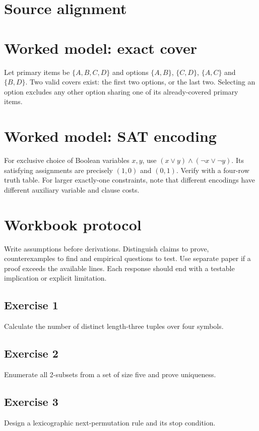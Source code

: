 \documentclass[11pt,letterpaper]{article}
\begin{document}
\tableofcontents
\clearpage
{}
\section{Source alignment}

\section{Worked model: exact cover}
Let primary items be $\{A,B,C,D\}$ and options $\{A,B\}$, $\{C,D\}$, $\{A,C\}$ and $\{B,D\}$. Two valid covers exist: the first two options, or the last two. Selecting an option excludes any other option sharing one of its already-covered primary items.
\section{Worked model: SAT encoding}
For exclusive choice of Boolean variables $x,y$, use $(x\lor y)\land(\neg x\lor\neg y)$. Its satisfying assignments are precisely $(1,0)$ and $(0,1)$. Verify with a four-row truth table. For larger exactly-one constraints, note that different encodings have different auxiliary variable and clause costs.

\section{Workbook protocol}
Write assumptions before derivations. Distinguish claims to prove, counterexamples to find and empirical questions to test. Use separate paper if a proof exceeds the available lines. Each response should end with a testable implication or explicit limitation.

\subsection{Exercise 1}\noindent Calculate the number of distinct length-three tuples over four symbols.
\subsection{Exercise 2}\noindent Enumerate all 2-subsets from a set of size five and prove uniqueness.
\subsection{Exercise 3}\noindent Design a lexicographic next-permutation rule and its stop condition.
\end{document}
